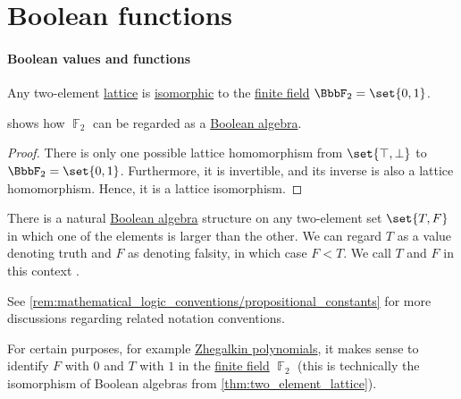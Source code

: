 \section{Boolean functions}\label{sec:boolean_functions}

\paragraph{Boolean values and functions}

\begin{proposition}\label{thm:two_element_lattice}
  Any two-element \hyperref[def:lattice]{lattice} is \hyperref[def:lattice/homomorphism]{isomorphic} to the \hyperref[def:finite_field]{finite field} \( \BbbF_2 = \set{ 0, 1 } \).
\end{proposition}
\begin{comments}
  \item {} shows how \( \BbbF_2 \) can be regarded as a \hyperref[def:boolean_algebra]{Boolean algebra}.
\end{comments}
\begin{proof}
  There is only one possible lattice homomorphism from \( \set{ \top, \bot } \) to \( \BbbF_2 = \set{ 0, 1 } \). Furthermore, it is invertible, and its inverse is also a lattice homomorphism. Hence, it is a lattice isomorphism.
\end{proof}

\begin{concept}\label{con:boolean_value}\mimprovised
  There is a natural \hyperref[def:boolean_algebra]{Boolean algebra} structure on any two-element set \( \set{ T, F } \) in which one of the elements is larger than the other. We can regard \( T \) as a value denoting truth and \( F \) as denoting falsity, in which case \( F < T \). We call \( T \) and \( F \) in this context .
\end{concept}
\begin{comments}
  \item See \cref{rem:mathematical_logic_conventions/propositional_constants} for more discussions regarding related notation conventions.

  \item For certain purposes, for example \hyperref[def:zhegalkin_polynomial]{Zhegalkin polynomials}, it makes sense to identify \( F \) with \( 0 \) and \( T \) with \( 1 \) in the \hyperref[def:finite_field]{finite field} \( \BbbF_2 \) (this is technically the isomorphism of Boolean algebras from \cref{thm:two_element_lattice}).
\end{comments}

